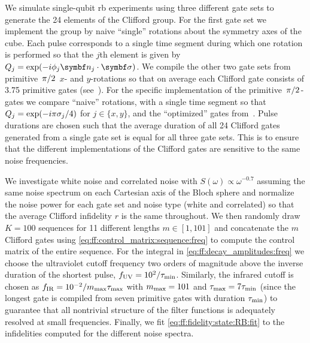 We simulate single-qubit \gls{rb} experiments using three different gate sets to generate the 24 elements of the Clifford group.
For the first gate set we implement the group by naive \enquote{single} rotations about the symmetry axes of the cube.
Each pulse corresponds to a single time segment during which one rotation is performed so that the $j$th element is given by $Q_j = \exp(-\i\phi_j\bvec{n}_j\cdot\bvec{\sigma})$.
We compile the other two gate sets from primitive $\flatfrac{\pi}{2}$ $x$- and $y$-rotations so that on average each Clifford gate consists of \num{3.75} primitive gates (see~).
For the specific implementation of the primitive $\flatfrac{\pi}{2}$-gates we compare \enquote{naive} rotations, \ie with a single time segment so that $Q_j = \exp(-i\pi\sigma_j/4)$ for $j\in\lbrace x, y\rbrace$, and the \enquote{optimized} gates from~.
Pulse durations are chosen such that the average duration of all 24 Clifford gates generated from a single gate set is equal for all three gate sets.
This is to ensure that the different implementations of the Clifford gates are sensitive to the same noise frequencies.

We investigate white noise and correlated noise with $S(\omega)\propto\omega^{-0.7}$ assuming the same noise spectrum on each Cartesian axis of the Bloch sphere and normalize the noise power for each gate set and noise type (white and correlated) so that the average Clifford infidelity $r$ is the same throughout.
We then randomly draw $K = \num{100}$ sequences for \num{11} different lengths $m\in[1, 101]$ and concatenate the $m$ Clifford gates using \cref{eq:ff:control_matrix:sequence:freq} to compute the control matrix of the entire sequence.
For the integral in \cref{eq:ff:decay_amplitudes:freq} we choose the ultraviolet cutoff frequency two orders of magnitude above the inverse duration of the shortest pulse, $f_{\mathrm{UV}} = 10^2/\tau_{\mathrm{min}}$.
Similarly, the infrared cutoff is chosen as $f_{\mathrm{IR}} = 10^{-2}/m_{\mathrm{max}}\tau_{\mathrm{max}}$ with $m_{\mathrm{max}} = 101$ and $\tau_{\mathrm{max}} = 7\tau_{\mathrm{min}}$ (since the longest gate is compiled from seven primitive gates with duration $\tau_{\mathrm{min}}$) to guarantee that all nontrivial structure of the filter functions is adequately resolved at small frequencies.
Finally, we fit \cref{eq:ff:fidelity:state:RB:fit} to the infidelities computed for the different noise spectra.

